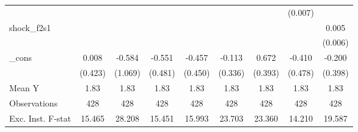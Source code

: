{\begin{tabular}{l*{8}{c}}
            &                     &                     &                     &                     &                     &                     &     (0.007)         &                     \\
\addlinespace
shock\_f2s1  &                     &                     &                     &                     &                     &                     &                     &       0.005         \\
            &                     &                     &                     &                     &                     &                     &                     &     (0.006)         \\
\addlinespace
\_cons      &       0.008         &      -0.584         &      -0.551         &      -0.457         &      -0.113         &       0.672         &      -0.410         &      -0.200         \\
            &     (0.423)         &     (1.069)         &     (0.481)         &     (0.450)         &     (0.336)         &     (0.393)         &     (0.478)         &     (0.398)         \\
\midrule
Mean Y      &        1.83         &        1.83         &        1.83         &        1.83         &        1.83         &        1.83         &        1.83         &        1.83         \\
Observations&         428         &         428         &         428         &         428         &         428         &         428         &         428         &         428         \\
Exc. Inst. F-stat&      15.465         &      28.208         &      15.451         &      15.993         &      23.703         &      23.360         &      14.210         &      19.587         \\
\bottomrule
\end{tabular}
}
